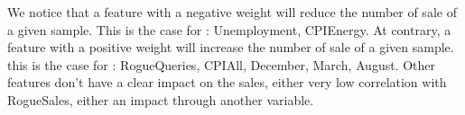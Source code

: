 \documentclass{article}
\begin{document}
    We notice that a feature with a negative weight will reduce the number of sale of a given sample. This is the case for :
    Unemployment, CPIEnergy.
    At contrary, a feature with a positive weight will increase the number of sale of a given sample. this is the case for :
    RogueQueries, CPIAll, December, March, August.
    Other features don't have a clear impact on the sales, either very low correlation with RogueSales, either an impact through another variable.

    
\end{document}
